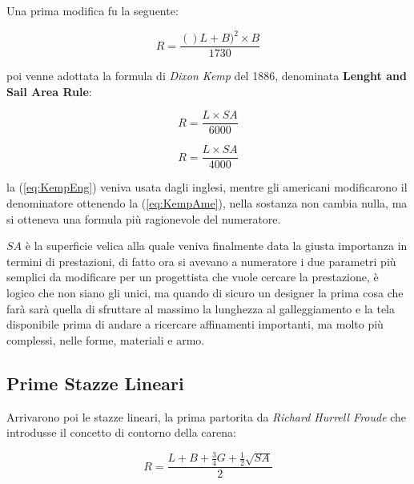 			Una prima modifica fu la seguente:
			
			\begin{center}
				\begin{equation}
				R=\frac{()L+B)^2 \times B}{1730}
				\label{eq:1730}
				\end{equation}
			\end{center}
			
			poi venne adottata la formula di \textit{Dixon Kemp} del 1886, denominata \textbf{Lenght and Sail Area Rule}:
			
			\begin{center}
				\begin{equation}
					R=\frac{L \times SA}{6000}
					\label{eq:KempEng}
				\end{equation}
			\end{center}
			
			\begin{center}
				\begin{equation}
					R=\frac{L \times SA}{4000}
					\label{eq:KempAme}
				\end{equation}
			\end{center}
			
			la (\ref{eq:KempEng}) veniva usata dagli inglesi, mentre gli americani modificarono il denominatore ottenendo la (\ref{eq:KempAme}), nella sostanza non cambia nulla, ma si otteneva una formula più ragionevole del numeratore.
			
			$SA$ è la superficie velica alla quale veniva finalmente data la giusta importanza in termini di prestazioni, di fatto ora si avevano a numeratore i due parametri più semplici da modificare per un progettista che vuole cercare la prestazione, è logico che non siano gli unici, ma quando di sicuro un designer la prima cosa che farà sarà quella di sfruttare al massimo la lunghezza al galleggiamento e la tela disponibile prima di andare a  ricercare affinamenti importanti, ma molto più complessi, nelle forme, materiali e armo.
			
		\subsection{Prime Stazze Lineari}
			Arrivarono poi le stazze lineari, la prima partorita da \textit{Richard Hurrell Froude} che introdusse il concetto di contorno della carena:
			
			\begin{center}
				\begin{equation}
				R=\frac{L+B+\frac{3}{4}G+\frac{1}{2}\sqrt{SA}}{2}
				\label{eq:StazzaFroude}
				\end{equation}
			\end{center}
			

